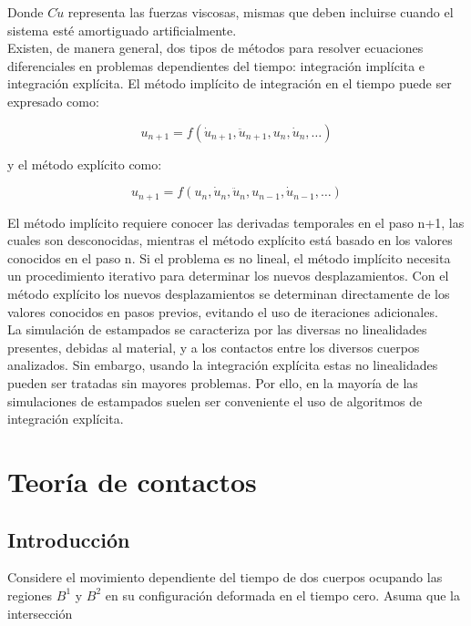 Donde $C\dot{u}$ representa las fuerzas viscosas, mismas que deben incluirse cuando el sistema esté amortiguado artificialmente.\\ 
Existen, de manera general, dos tipos de métodos para resolver ecuaciones diferenciales  en problemas dependientes del tiempo: integración implícita e integración explícita. El método implícito de integración en el tiempo puede ser expresado como:

\begin{equation}
u_{n+1}=f(\dot{u}_{n+1},\ddot{u}_{n+1},u_n,\dot{u}_n,…)
\end{equation}

y el método explícito como:

\begin{equation}
u_{n+1}=f(u_n,\dot{u}_n,\ddot{u}_n,u_{n-1},\dot{u}_{n-1},…)
\end{equation}

El método implícito requiere conocer las derivadas temporales en el paso n+1, las cuales son desconocidas, mientras el método explícito está basado en los valores conocidos en el paso n. Si el problema es no lineal, el método implícito necesita un procedimiento iterativo para determinar los nuevos desplazamientos. Con el método explícito los nuevos desplazamientos se determinan directamente de los valores conocidos en pasos previos, evitando el uso de iteraciones adicionales.\\

La simulación de estampados se caracteriza por las diversas no linealidades presentes, debidas al material, y a los contactos entre los diversos cuerpos analizados. Sin embargo, usando la integración explícita estas no linealidades pueden ser tratadas sin mayores problemas. Por ello, en la mayoría de las simulaciones de estampados suelen ser conveniente el uso de algoritmos de integración explícita.

\section{Teoría de contactos}

\subsection{Introducción}

Considere el movimiento dependiente del tiempo de dos cuerpos ocupando las regiones $B^1$ y $B^2$ 
en su configuración deformada en el tiempo cero. Asuma que la intersección

